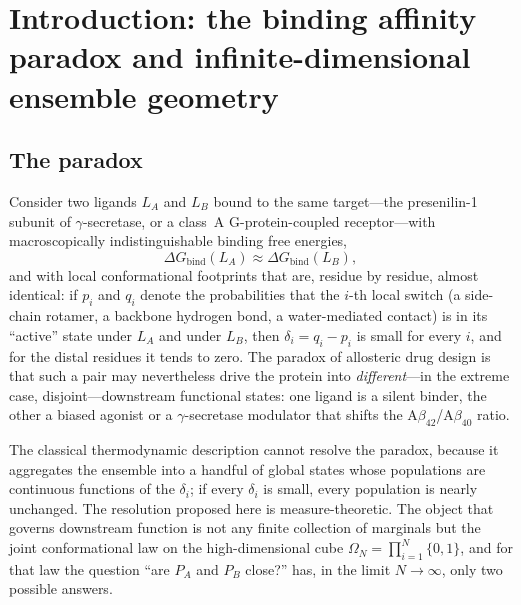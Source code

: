 \documentclass[11pt,reqno]{amsart}
\theoremstyle{plain}
\theoremstyle{definition}
\theoremstyle{remark}
\numberwithin{equation}{section}
\newcommand{\LA}{L_A}
\newcommand{\LB}{L_B}
\newcommand{\PA}{P_{A}}
\newcommand{\PB}{P_{B}}
\begin{document}
\maketitle
\tableofcontents

\section{Introduction: the binding affinity paradox and infinite-dimensional ensemble geometry}
\label{sec:intro}

\subsection*{The paradox}
Consider two ligands $\LA$ and $\LB$ bound to the same target---the presenilin-1 subunit of $\gamma$-secretase, or a class~A G-protein-coupled receptor---with macroscopically indistinguishable binding free energies,
\[
\Delta G_{\mathrm{bind}}(\LA)\approx\Delta G_{\mathrm{bind}}(\LB),
\]
and with local conformational footprints that are, residue by residue, almost identical: if $p_i$ and $q_i$ denote the probabilities that the $i$-th local switch (a side-chain rotamer, a backbone hydrogen bond, a water-mediated contact) is in its ``active'' state under $\LA$ and under $\LB$, then $\delta_i=q_i-p_i$ is small for every $i$, and for the distal residues it tends to zero. The paradox of allosteric drug design \cite{Nussinov2013,Motlagh2014} is that such a pair may nevertheless drive the protein into \emph{different}---in the extreme case, disjoint---downstream functional states: one ligand is a silent binder, the other a biased agonist or a $\gamma$-secretase modulator that shifts the A$\beta_{42}$/A$\beta_{40}$ ratio.

The classical thermodynamic description \cite{MWC1965} cannot resolve the paradox, because it aggregates the ensemble into a handful of global states whose populations are continuous functions of the $\delta_i$; if every $\delta_i$ is small, every population is nearly unchanged. The resolution proposed here is measure-theoretic. The object that governs downstream function is not any finite collection of marginals but the joint conformational law on the high-dimensional cube $\Omega_N=\prod_{i=1}^N\{0,1\}$, and for that law the question ``are $\PA$ and $\PB$ close?'' has, in the limit $N\to\infty$, only two possible answers.
\end{document}
